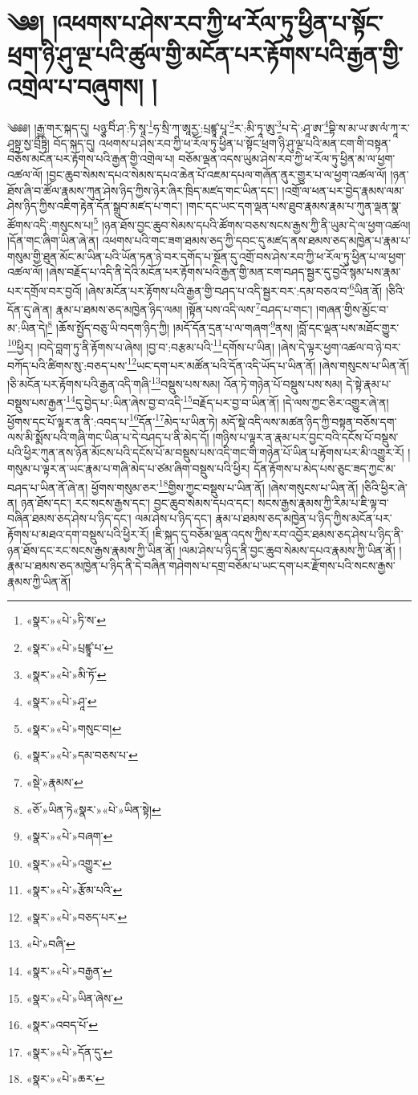 \chapter{༄༅། །འཕགས་པ་ཤེས་རབ་ཀྱི་ཕ་རོལ་ཏུ་ཕྱིན་པ་སྟོང་ཕྲག་ཉི་ཤུ་ལྔ་པའི་ཚུལ་གྱི་མངོན་པར་རྟོགས་པའི་རྒྱན་གྱི་འགྲེལ་པ་བཞུགས། །}༄༅༅། །རྒྱ་གར་སྐད་དུ། པཉྩ་བིཾ་ཤ་:ཏི་སཱ་\footnote{«སྣར་»«པེ་»ཏི་ས་}ཧ་སྲི་ཀ་ཨཱརྱ་:པྲཛྙཱ་པཱ་\footnote{«སྣར་»«པེ་»པྲཛྙཱ་པ་}ར་:མི་ཏཱ་ཨུ་\footnote{«སྣར་»«པེ་»མི་ཏོ་}པ་དེ་:ཤཱ་ཨ་\footnote{«སྣར་»«པེ་»ཤཱ་}བྷི་ས་མ་ཡ་ཨ་ལཾ་ཀཱ་ར་ཤཱསྟྲ་སྱ་བྲྀཏྟི། བོད་སྐད་དུ། འཕགས་པ་ཤེས་རབ་ཀྱི་ཕ་རོལ་ཏུ་ཕྱིན་པ་སྟོང་ཕྲག་ཉི་ཤུ་ལྔ་པའི་མན་ངག་གི་བསྟན་བཅོས་མངོན་པར་རྟོགས་པའི་རྒྱན་གྱི་འགྲེལ་པ། བཅོམ་ལྡན་འདས་ཡུམ་ཤེས་རབ་ཀྱི་ཕ་རོལ་ཏུ་ཕྱིན་མ་ལ་ཕྱག་འཚལ་ལོ། །བྱང་ཆུབ་སེམས་དཔའ་སེམས་དཔའ་ཆེན་པོ་འཇམ་དཔལ་གཞོན་ནུར་གྱུར་པ་ལ་ཕྱག་འཚལ་ལོ། །ཉན་ཐོས་ཞི་བ་ཚོལ་རྣམས་ཀུན་ཤེས་ཉིད་ཀྱིས་ཉེར་ཞིར་ཁྲིད་མཛད་གང་ཡིན་དང་། །འགྲོ་ལ་ཕན་པར་བྱེད་རྣམས་ལམ་ཤེས་ཉིད་ཀྱིས་འཇིག་རྟེན་དོན་སྒྲུབ་མཛད་པ་གང་། །གང་དང་ཡང་དག་ལྡན་པས་ཐུབ་རྣམས་རྣམ་པ་ཀུན་ལྡན་སྣ་ཚོགས་འདི་:གསུངས་པ།\footnote{«སྣར་»«པེ་»གསུང་བ།} །ཉན་ཐོས་བྱང་ཆུབ་སེམས་དཔའི་ཚོགས་བཅས་སངས་རྒྱས་ཀྱི་ནི་ཡུམ་དེ་ལ་ཕྱག་འཚལ། །དོན་གང་ཞིག་ཡིན་ཞེ་ན། འཕགས་པའི་གང་ཟག་ཐམས་ཅད་ཀྱི་དབང་དུ་མཛད་ནས་ཐམས་ཅད་མཁྱེན་པ་རྣམ་པ་གསུམ་གྱི་ཐུན་མོང་མ་ཡིན་པའི་ཡོན་ཏན་ཉེ་བར་དགོད་པ་སྔོན་དུ་འགྲོ་བས་ཤེས་རབ་ཀྱི་ཕ་རོལ་ཏུ་ཕྱིན་པ་ལ་ཕྱག་འཚལ་ལོ། །ཞེས་བརྗོད་པ་འདི་ནི་དེའི་མངོན་པར་རྟོགས་པའི་རྒྱན་གྱི་མན་ངག་བཤད་སྦྱར་དུ་བྱའོ་སྙམ་པས་རྣམ་པར་དགྲོལ་བར་བྱའོ། །ཞེས་མངོན་པར་རྟོགས་པའི་རྒྱན་གྱི་བཤད་པ་འདི་སྦྱར་བར་:དམ་བཅའ་བ་\footnote{«སྣར་»«པེ་»དམ་བཅས་པ་}ཡིན་ནོ། །ཅིའི་དོན་དུ་ཞེ་ན། རྣམ་པ་ཐམས་ཅད་མཁྱེན་ཉིད་ལམ། །སྟོན་པས་འདི་ལས་\footnote{«སྡེ་»རྣམས་}བཤད་པ་གང་། །གཞན་གྱིས་མྱོང་བ་མ་:ཡིན་དེ།\footnote{«ཅོ་»ཡིན་ཏེ«སྣར་»«པེ་»ཡིན་སྟེ།} །ཆོས་སྤྱོད་བཅུ་ཡི་བདག་ཉིད་ཀྱི། །མདོ་དོན་དྲན་པ་ལ་གཞག་\footnote{«སྣར་»«པེ་»བཞག་}ནས། །བློ་དང་ལྡན་པས་མཐོང་གྱུར་\footnote{«སྣར་»«པེ་»འགྱུར་}ཕྱིར། །བདེ་བླག་ཏུ་ནི་རྟོགས་པ་ཞེས། །བྱ་བ་:བརྩམ་པའི་\footnote{«སྣར་»«པེ་»རྩོམ་པའི་}དགོས་པ་ཡིན། །ཞེས་དེ་ལྟར་ཕྱག་འཚལ་བ་ཉེ་བར་བཀོད་པའི་ཚིགས་སུ་:བཅད་པས་\footnote{«སྣར་»«པེ་»བཅད་པར་}ཡང་དག་པར་མཚོན་པའི་དོན་འདི་ཡོད་པ་ཡིན་ནོ། །ཞེས་གསུངས་པ་ཡིན་ནོ། །ཅི་མངོན་པར་རྟོགས་པའི་རྒྱན་འདི་གཞི་\footnote{«པེ་»བཞི་}བསྡུས་པས་སམ། འོན་ཏེ་གཉེན་པོ་བསྡུས་པས་སམ། དེ་སྟེ་རྣམ་པ་བསྡུས་པས་རྒྱན་\footnote{«སྣར་»«པེ་»བརྒྱན་}དུ་བྱེད་པ་:ཡིན་ཞེས་བྱ་བ་འདི་\footnote{«སྣར་»«པེ་»ཡིན་ཞེས་}བརྗོད་པར་བྱ་བ་ཡིན་ནོ། །དེ་ལས་ཀྱང་ཅིར་འགྱུར་ཞེ་ན། ཕྱོགས་དང་པོ་ལྟར་ན་ནི་:འབད་པ་\footnote{«སྣར་»འབད་པོ་}དོན་\footnote{«སྣར་»«པེ་»དོན་དུ་}མེད་པ་ཡིན་ཏེ། མདོ་སྡེ་འདི་ལས་མཚན་ཉིད་ཀྱི་བསྟན་བཅོས་དག་ལས་མི་སྨོས་པའི་གཞི་གང་ཡིན་པ་དེ་བཤད་པ་ནི་མེད་དོ། །གཉིས་པ་ལྟར་ན་རྣམ་པར་བྱང་བའི་དངོས་པོ་བསྡུས་པའི་ཕྱིར་ཀུན་ནས་ཉོན་མོངས་པའི་དངོས་པོ་མ་བསྡུས་པས་འདི་གང་གི་གཉེན་པོ་ཡིན་པ་རྟོགས་པར་མི་འགྱུར་རོ། །གསུམ་པ་ལྟར་ན་ཡང་རྣམ་པ་གཞི་མེད་པ་ཙམ་ཞིག་བསྡུས་པའི་ཕྱིར། དོན་རྟོགས་པ་མེད་པས་ཅུང་ཟད་ཀྱང་མ་བཤད་པ་ཡིན་ནོ་ཞེ་ན། ཕྱོགས་གསུམ་ཅར་\footnote{«སྣར་»«པེ་»ཆར་}གྱིས་ཀྱང་བསྡུས་པ་ཡིན་ནོ། །ཞེས་གསུངས་པ་ཡིན་ནོ། །ཅིའི་ཕྱིར་ཞེ་ན། ཉན་ཐོས་དང་། རང་སངས་རྒྱས་དང་། བྱང་ཆུབ་སེམས་དཔའ་དང་། སངས་རྒྱས་རྣམས་ཀྱི་རིམ་པ་ཇི་ལྟ་བ་བཞིན་ཐམས་ཅད་ཤེས་པ་ཉིད་དང་། ལམ་ཤེས་པ་ཉིད་དང་། རྣམ་པ་ཐམས་ཅད་མཁྱེན་པ་ཉིད་ཀྱིས་མངོན་པར་རྟོགས་པ་མཐའ་དག་བསྡུས་པའི་ཕྱིར་རོ། །ཇི་སྐད་དུ་བཅོམ་ལྡན་འདས་ཀྱིས་རབ་འབྱོར་ཐམས་ཅད་ཤེས་པ་ཉིད་ནི་ཉན་ཐོས་དང་རང་སངས་རྒྱས་རྣམས་ཀྱི་ཡིན་ནོ། །ལམ་ཤེས་པ་ཉིད་ནི་བྱང་ཆུབ་སེམས་དཔའ་རྣམས་ཀྱི་ཡིན་ནོ། །རྣམ་པ་ཐམས་ཅད་མཁྱེན་པ་ཉིད་ནི་དེ་བཞིན་གཤེགས་པ་དགྲ་བཅོམ་པ་ཡང་དག་པར་རྫོགས་པའི་སངས་རྒྱས་རྣམས་ཀྱི་ཡིན་ནོ། 